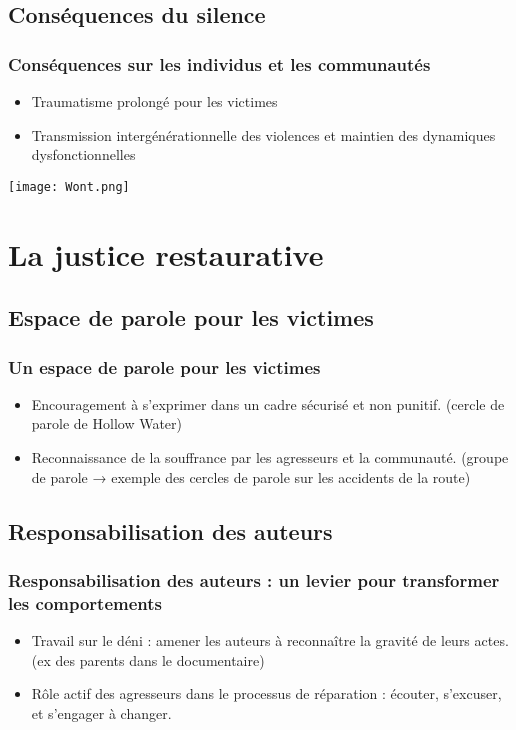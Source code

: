 \documentclass[french]{beamer}
\begin{document}
\subsection{Conséquences du silence}
\begin{frame}
  \frametitle{Conséquences sur les individus et les communautés}
  \begin{itemize}
    \item Traumatisme prolongé pour les victimes
    \item Transmission intergénérationnelle des violences et maintien des dynamiques dysfonctionnelles
  \end{itemize}
  \begin{center}
    \texttt{[image: Wont.png]}
  \end{center}
\end{frame}

\section{La justice restaurative}
\subsection{Espace de parole pour les victimes}
\begin{frame}
  \frametitle{Un espace de parole pour les victimes}
  \begin{itemize}
    \item Encouragement à s’exprimer dans un cadre sécurisé et non punitif. (cercle de parole de Hollow Water)
    \item Reconnaissance de la souffrance par les agresseurs et la communauté. (groupe de parole → exemple des cercles de parole sur les accidents de la route)
  \end{itemize}
\end{frame}

\subsection{Responsabilisation des auteurs}
\begin{frame}
  \frametitle{Responsabilisation des auteurs : un levier pour transformer les comportements}
  \begin{itemize}
    \item Travail sur le déni : amener les auteurs à reconnaître la gravité de leurs actes. (ex des parents dans le documentaire)
    \item Rôle actif des agresseurs dans le processus de réparation : écouter, s’excuser, et s’engager à changer.
  \end{itemize}
\end{frame}
\end{document}
